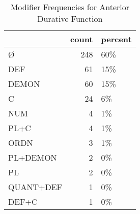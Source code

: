 \begin{table}[htbp!]
\centering
\caption{Modifier Frequencies for Anterior Durative Function}
\label{table:antdur_mod_cp}
\begin{tabular}{lrl}
\toprule
{} &  count & percent \\
\midrule
Ø         &    248 &     60\% \\
DEF       &     61 &     15\% \\
DEMON     &     60 &     15\% \\
C         &     24 &      6\% \\
NUM       &      4 &      1\% \\
PL+C      &      4 &      1\% \\
ORDN      &      3 &      1\% \\
PL+DEMON  &      2 &      0\% \\
PL        &      2 &      0\% \\
QUANT+DEF &      1 &      0\% \\
DEF+C     &      1 &      0\% \\
\bottomrule
\end{tabular}
\end{table}

